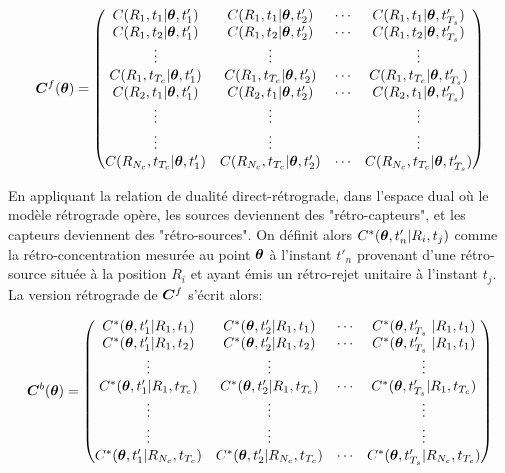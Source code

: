 \begin{equation}
{\bm{C}}^f({\bm{\theta}}) = 
\begin{pmatrix}
C(R_1,t_1 | {\bm{\theta}}, t'_1) & C(R_1,t_1 | {\bm{\theta}}, t'_2) & \cdots & C(R_1, t_1 |{\bm{\theta}}, t'_{T_s}) \\
C(R_1,t_2 | {\bm{\theta}}, t'_1) & C(R_1,t_2 | {\bm{\theta}}, t'_2) & \cdots & C(R_1, t_2 |{\bm{\theta}}, t'_{T_s}) \\
\vdots & \vdots & & \vdots \\
C(R_1,t_{T_c} | {\bm{\theta}}, t'_1) & C(R_1,t_{T_c} | {\bm{\theta}}, t'_2) & \cdots & C(R_1, t_{T_c} |{\bm{\theta}}, t'_{T_s}) \\
C(R_2,t_1| {\bm{\theta}}, t'_1) & C(R_2,t_1 | {\bm{\theta}}, t'_2) & \cdots & C(R_2, t_1 |{\bm{\theta}}, t'_{T_s}) \\
\vdots & \vdots & & \vdots \\
\vdots & \vdots & & \vdots \\
C(R_{N_c},t_{T_c} | {\bm{\theta}}, t'_1) & C(R_{N_c},t_{T_c} | {\bm{\theta}}, t'_2) & \cdots & C(R_{N_c}, t_{T_c} |{\bm{\theta}}, t'_{T_s}) \\
\end{pmatrix}
\label{eq_matrix_forward}
\end{equation}

En appliquant la relation de dualité {direct-rétrograde}, dans l'espace dual où le modèle {rétrograde} opère, les sources deviennent des "rétro-capteurs", et les capteurs deviennent des "rétro-sources". On définit alors $C^*({\bm{\theta}},t'_n | R_i, t_j)$ comme la rétro-concentration mesurée au point ${\bm{\theta}}$ à l'instant $t'_n$ provenant d'une rétro-source située à la position $R_i$ et ayant émis un rétro-rejet unitaire à l'instant $t_j$. La version {rétrograde} de ${\bm{C}}^f$ s'écrit alors:

\begin{equation}
\MatC^b (\VecTheta)= 
\begin{pmatrix}
	C^*(\VecTheta, t'_1 | R_1, t_1) & C^*(\VecTheta, t'_2 | R_1, t_1) & \cdots & C^*(\VecTheta, t'_{T_s} | R_1, t_1) \\
	C^*(\VecTheta, t'_1 | R_1, t_2) & C^*(\VecTheta, t'_2 | R_1, t_2) & \cdots & C^*(\VecTheta, t'_{T_s} | R_1, t_1) \\
	\vdots & \vdots & & \vdots \\
	C^*(\VecTheta, t'_1| R_1,t_{T_c}) & C^*(\VecTheta, t'_2 | R_1, t_{T_c}) & \cdots & C^*(\VecTheta, t'_{T_s} | R_1, t_{T_c}) \\ 
	\vdots & \vdots & & \vdots \\
	\vdots & \vdots & & \vdots \\
	C^*(\VecTheta, t'_1| R_{N_c},t_{T_c}) & C^*(\VecTheta, t'_2 | R_{N_c}, t_{T_c}) & \cdots & C^*(\VecTheta, t'_{T_s} | R_{N_c}, t_{T_c}) \\ 
	
\end{pmatrix}
\label{eq_matrix_backward}
\end{equation}

